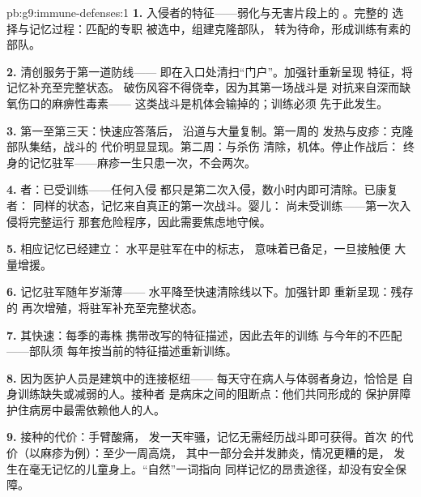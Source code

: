 \begin{solution}{pb:g9:immune-defenses:1}
\textbf{1.} 入侵者的特征——弱化与无害片段上的
。完整的
选择与记忆过程：匹配的专职
被选中，组建克隆部队，
转为待命，形成训练有素的部队。

\textbf{2.} 清创服务于第一道防线——
即在入口处清扫“门户”。加强针重新呈现
特征，将记忆补充至完整状态。
破伤风容不得侥幸，因为其第一场战斗是
对抗来自深而缺氧伤口的麻痹性毒素——
这类战斗是机体会输掉的；训练必须
先于此发生。

\textbf{3.} 第一至第三天：快速应答落后，
沿道与大量复制。第一周的
发热与皮疹：克隆部队集结，战斗的
代价明显显现。第二周：与杀伤
清除，机体。停止作战后：
终身的记忆驻军——麻疹一生只患一次，不会两次。

\textbf{4.} 者：已受训练——任何入侵
都只是第二次入侵，数小时内即可清除。已康复者：
同样的状态，记忆来自真正的第一次战斗。婴儿：
尚未受训练——第一次入侵将完整运行
那套危险程序，因此需要焦虑地守候。

\textbf{5.} 相应记忆已经建立：
水平是驻军在中的标志，
意味着已备足，一旦接触便
大量增援。

\textbf{6.} 记忆驻军随年岁渐薄——
水平降至快速清除线以下。加强针即
重新呈现：残存的
再次增殖，将驻军补充至完整状态。

\textbf{7.} 其快速：每季的毒株
携带改写的特征描述，因此去年的训练
与今年的不匹配——部队须
每年按当前的特征描述重新训练。

\textbf{8.} 因为医护人员是建筑中的连接枢纽——
每天守在病人与体弱者身边，恰恰是
自身训练缺失或减弱的人。接种者
是病床之间的阻断点：他们共同形成的
保护屏障护住病房中最需依赖他人的人。

\textbf{9.} 接种的代价：手臂酸痛，
发一天牢骚，记忆无需经历战斗即可获得。首次
的代价（以麻疹为例）：至少一周高烧，
其中一部分会并发肺炎，情况更糟的是，
发生在毫无记忆的儿童身上。“自然”一词指向
同样记忆的昂贵途径，却没有安全保障。


\end{solution}
